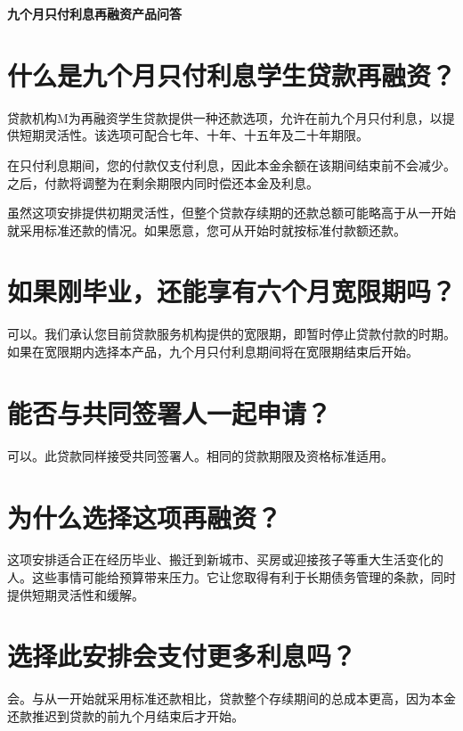 \documentclass[UTF8,fontset=none,11pt,a4paper]{ctexart}
\begin{document}
{\noindent\fontsize{20}{25}\selectfont\bfseries 九个月只付利息再融资产品问答\par}
\vspace{10pt}
\section*{什么是九个月只付利息学生贷款再融资？}
贷款机构M为再融资学生贷款提供一种还款选项，允许在前九个月只付利息，以提供短期灵活性。该选项可配合七年、十年、十五年及二\allowbreak\mbox{十年期限。}


在只付利息期间，您的付款仅支付利息，因此本金余额在该期间结束前不会减少。之后，付款将调整为在剩余期限内同时偿还本\allowbreak\mbox{金及利息。}


虽然这项安排提供初期灵活性，但整个贷款存续期的还款总额可能略高于从一开始就采用标准还款的情况。如果愿意，您可从开始时就按标准付\allowbreak\mbox{款额还款。}


\section*{如果刚毕业，还能享有六个月宽限期吗？}
可以。我们承认您目前贷款服务机构提供的宽限期，即暂时停止贷款付款的时期。如果在宽限期内选择本产品，九个月只付利息期间将在宽限期结\allowbreak\mbox{束后开始。}


\section*{能否与共同签署人一起申请？}
可以。此贷款同样接受共同签署人。相同的贷款期限及资格\allowbreak\mbox{标准适用。}


\section*{为什么选择这项再融资？}
这项安排适合正在经历毕业、搬迁到新城市、买房或迎接孩子等重大生活变化的人。这些事情可能给预算带来压力。它让您取得有利于长期债务管理的条款，同时提供短期灵活\allowbreak\mbox{性和缓解。}


\section*{选择此安排会支付更多利息吗？}
会。与从一开始就采用标准还款相比，贷款整个存续期间的总成本更高，因为本金还款推迟到贷款的前九个月结束\allowbreak\mbox{后才开始。}
\end{document}
